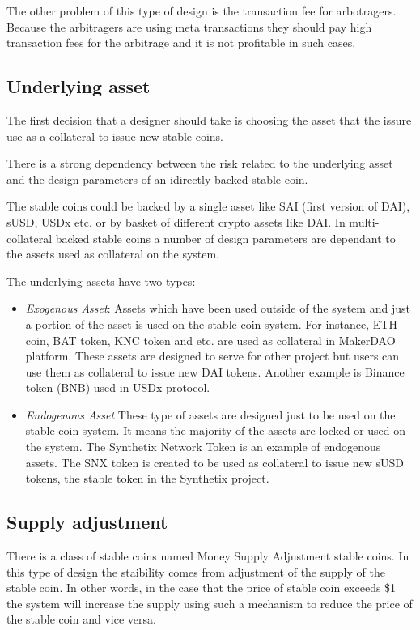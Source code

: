 The other problem of this type of design is the transaction fee for arbotragers. Because the arbitragers are using meta transactions they should pay high transaction fees for the arbitrage and it is not profitable in such cases.

\subsection{Underlying asset}
The first decision that a designer should take is choosing the asset that the issure use as a collateral to issue new stable coins.

There is a strong dependency between the risk related to the underlying asset and the design parameters of an idirectly-backed stable coin.

The stable coins could be backed by a single asset like SAI (first version of DAI), sUSD, USDx etc. or by basket of different crypto assets like DAI. In multi-collateral backed stable coins a number of design parameters are dependant to the assets used as collateral on the system.

The underlying assets have two types:

\begin{itemize}
	\item \emph{Exogenous Asset}: Assets which have been used outside of the system and just a portion of the asset is used on the stable coin system. For instance, ETH coin, BAT token, KNC token and etc. are used as collateral in MakerDAO platform. These assets are designed to serve for other project but users can use them as collateral to issue new DAI tokens.
	Another example is Binance token (BNB) used in USDx protocol. 
	\item \emph{Endogenous Asset} These type of assets are designed just to be used on the stable coin system. It means the majority of the assets are locked or used on the system. The Synthetix Network Token is an example of endogenous assets. The SNX token is created to be used as collateral to issue new sUSD tokens, the stable token in the Synthetix project.
\end{itemize}

\subsection{Supply adjustment}
There is a class of stable coins named Money Supply Adjustment stable coins. In this type of design the staibility comes from adjustment of the supply of the stable coin. In other words, in the case that the price of stable coin exceeds \$1 the system will increase the supply using such a mechanism to reduce the price of the stable coin and vice versa. 

